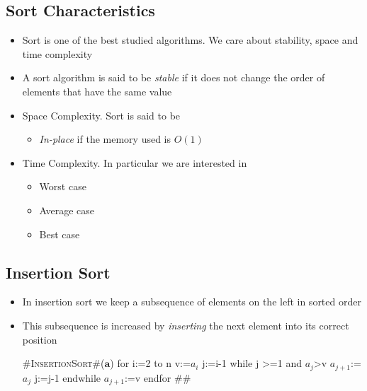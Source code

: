 \begin{slide}
\section[-1]{Sort Characteristics}

\begin{PauseHighLight}
  \begin{itemize}
  \item Sort is one of the best studied algorithms\pause.  We care about
    stability, space and time complexity\pause
  \item A sort algorithm is said to be \emph{stable} if it does not
    change the order of elements that have the same value\pause
  \item Space Complexity.  Sort is said to be
    \begin{itemize}
    \item \emph{In-place} if the memory used is $O(1)$\pause
    \end{itemize}
  \item Time Complexity.  In particular we are interested in
    \begin{itemize}
    \item Worst case
    \item Average case
    \item Best case\pause
    \end{itemize}
  \end{itemize}
\end{PauseHighLight}

\end{slide}


\begin{slide}
\section[-1]{Insertion Sort}

\pausebuild
\color{TwoColor}
\begin{itemize}
\item In insertion sort we keep a subsequence of elements on the left in
  sorted order\pauseh
\item This subsequence is increased by \textit{inserting} the next
  element into its correct position\pauseh\\
  \begin{minipage}{10cm}
    \begin{pseudo}
#\textsc{InsertionSort}#($\bm{a}$)
{
  for i:=2 to n
    v:=$a_i$
    j:=i-1
    while j >=1 and $a_j$>v
      $a_{j+1}$:=$a_j$
      j:=j-1
    endwhile
    $a_{j+1}$:=v
  endfor
}#\pauseh#      
    \end{pseudo}
  \end{minipage}\hfil
  \begin{minipage}{13cm}
    \pause
  \end{minipage}
\end{itemize}
\end{slide}

